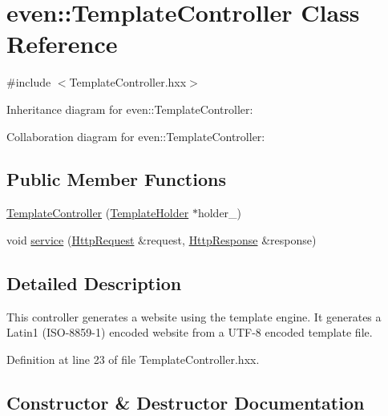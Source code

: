 \hypertarget{classeven_1_1_template_controller}{}\section{even\+:\+:Template\+Controller Class Reference}
\label{classeven_1_1_template_controller}


{\ttfamily \#include $<$Template\+Controller.\+hxx$>$}



Inheritance diagram for even\+:\+:Template\+Controller\+:


Collaboration diagram for even\+:\+:Template\+Controller\+:
\subsection*{Public Member Functions}
\begin{DoxyCompactItemize}
\item 
\mbox{\hyperlink{classeven_1_1_template_controller_ac1dd7d467754bd34c0f8091169f5c38f}{Template\+Controller}} (\mbox{\hyperlink{classeven_1_1_template_holder}{Template\+Holder}} $\ast$holder\+\_\+)
\item 
void \mbox{\hyperlink{classeven_1_1_template_controller_ad34c48cf60094e0deb73aa7145e93eac}{service}} (\mbox{\hyperlink{classstefanfrings_1_1_http_request}{Http\+Request}} \&request, \mbox{\hyperlink{classstefanfrings_1_1_http_response}{Http\+Response}} \&response)
\end{DoxyCompactItemize}


\subsection{Detailed Description}
This controller generates a website using the template engine. It generates a Latin1 (I\+S\+O-\/8859-\/1) encoded website from a U\+T\+F-\/8 encoded template file. 

Definition at line 23 of file Template\+Controller.\+hxx.



\subsection{Constructor \& Destructor Documentation}
\mbox{\label{classeven_1_1_template_controller_ac1dd7d467754bd34c0f8091169f5c38f}} 
